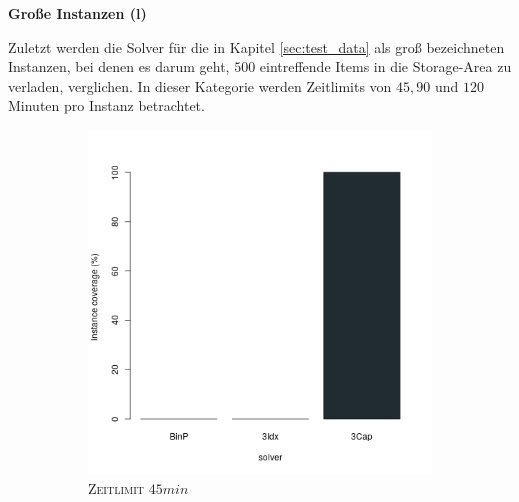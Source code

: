 \pagebreak

\textbf{Große Instanzen (l)}

Zuletzt werden die Solver für die in Kapitel \ref{sec:test_data} als groß bezeichneten Instanzen,
bei denen es darum geht, $500$ eintreffende Items in die Storage-Area zu verladen, verglichen.
In dieser Kategorie werden Zeitlimits von $45, 90$ und $120$ Minuten pro Instanz betrachtet.

\begin{figure}[H]
\centering

\begin{subfigure}[b]{0.3\textwidth}
\centering
\includegraphics[width=1.2\textwidth]{img/solver_instance_coverage_b=3_l_2700s.png}
\caption{\textsc{Zeitlimit} $45min$}
\label{fig:instance_coverage_b=3_l_a}
\end{subfigure}
\hfill
\begin{subfigure}[b]{0.3\textwidth}
\centering

\end{subfigure}
\end{figure}
